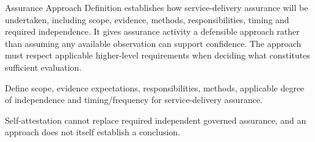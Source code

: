 Assurance Approach Definition establishes how service-delivery assurance will be undertaken, including scope, evidence, methods, responsibilities, timing and required independence. It gives assurance activity a defensible approach rather than assuming any available observation can support confidence. The approach must respect applicable higher-level requirements when deciding what constitutes sufficient evaluation.



Define scope, evidence expectations, responsibilities, methods, applicable degree of independence and timing/\allowbreak{}frequency for service-delivery assurance.



Self-attestation cannot replace required independent governed assurance, and an approach does not itself establish a conclusion.


